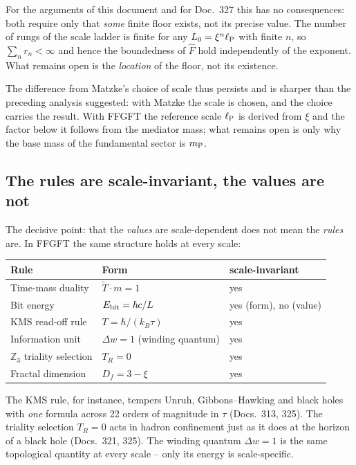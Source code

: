 For the arguments of this document and for Doc.~327 this has no
consequences: both require only that \emph{some} finite floor exists, not
its precise value. The number of rungs of the scale ladder is finite for
any $L_0 = \xi^n\ell_{\mathrm{P}}$ with finite $n$, so $\sum_n r_n < \infty$ and hence
the boundedness of $\hat F$ hold independently of the exponent.
What remains open is the \emph{location} of the floor, not its existence.

The difference from Matzke's choice of scale thus persists and is sharper
than the preceding analysis suggested: with Matzke the scale is chosen,
and the choice carries the result. With FFGFT the reference scale $\ell_{\mathrm{P}}$ is
derived from $\xi$ and the factor below it follows from the mediator mass;
what remains open is only why the base mass of the fundamental sector is
$m_{\mathrm{P}}$.

\subsection{The rules are scale-invariant, the values are not}

The decisive point: that the \emph{values} are scale-dependent does not
mean the \emph{rules} are. In FFGFT the same structure holds at every
scale:

\begin{center}
\small
\begin{tabular}{@{}lll@{}}
  \toprule
  \textbf{Rule} & \textbf{Form} & \textbf{scale-invariant} \\
  \midrule
  Time-mass duality & $\tilde T\cdot m = 1$ & yes \\
  Bit energy & $E_{\mathrm{bit}} = \hbar c/L$ & yes (form), no (value) \\
  KMS read-off rule & $T = \hbar/(k_B\tau)$ & yes \\
  Information unit & $\Delta w = 1$ (winding quantum) & yes \\
  $\mathbb{Z}_3$ triality selection & $T_R = 0$ & yes \\
  Fractal dimension & $D_f = 3-\xi$ & yes \\
  \bottomrule
\end{tabular}
\end{center}

The KMS rule, for instance, tempers Unruh, Gibbons--Hawking and black
holes with \emph{one} formula across 22 orders of magnitude in $\tau$
(Docs.~313, 325). The triality selection $T_R = 0$ acts in hadron
confinement just as it does at the horizon of a black hole
(Docs.~321, 325). The winding quantum $\Delta w = 1$ is the same
topological quantity at every scale -- only its energy is scale-specific.

